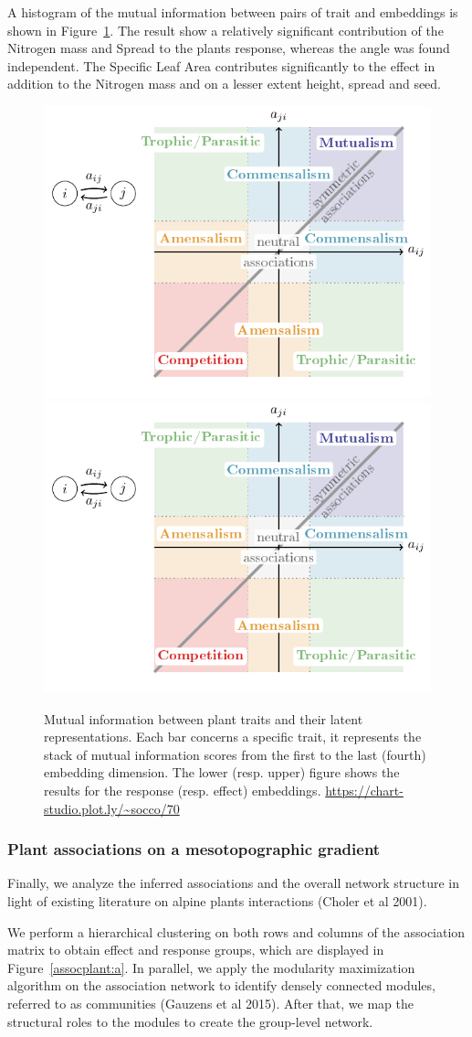 \documentclass[10pt,a4paper]{article}
\newcommand{\inclPlt}[2]{\includegraphics[page=#1]{tikz_figures.pdf}}
\begin{document}
A histogram of the mutual information between pairs of trait and embeddings is shown in Figure~\ref{mitraitemb}.
The result show a relatively significant contribution of the Nitrogen mass and Spread to the plants response, whereas the angle was found independent. The Specific Leaf Area contributes significantly to the effect in addition to the Nitrogen mass and on a lesser extent height, spread and seed.  

\begin{figure}[bthp]
  \inclPlt{9}{hist_AlpsMIEff}
  \inclPlt{10}{hist_AlpsMIRes}
	\caption{Mutual information between plant traits and their latent representations. Each bar concerns a specific trait, it represents the stack of mutual information scores from the first to the last (fourth) embedding dimension. The lower (resp. upper) figure shows the results for the response (resp. effect) embeddings. \url{https://chart-studio.plot.ly/~socco/70}} \label{mitraitemb}
\end{figure}

\subsubsection{Plant associations on a mesotopographic gradient}
Finally, we analyze the inferred associations and the overall network structure in light of existing literature on alpine plants interactions (Choler et al 2001).

We perform a hierarchical clustering on both rows and columns of the association matrix to obtain effect and response groups, which are displayed in Figure~\ref{assocplant:a}. In parallel, we apply the modularity maximization algorithm on the association network to identify densely connected modules, referred to as communities (Gauzens et al 2015). After that, we map the structural roles to the modules to create the group-level network.
\end{document}
